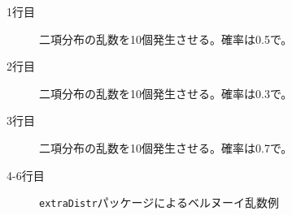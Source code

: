 \begin{description}
	\item[1行目] 二項分布の乱数を10個発生させる。確率は0.5で。
	\item[2行目] 二項分布の乱数を10個発生させる。確率は0.3で。
	\item[3行目] 二項分布の乱数を10個発生させる。確率は0.7で。
	\item[4-6行目] \texttt{extraDistr}パッケージによるベルヌーイ乱数例
\end{description}
